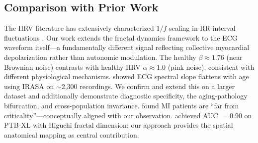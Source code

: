 \documentclass[11pt,a4paper]{article}
\begin{document}
\subsection{Comparison with Prior Work}
The HRV literature has extensively characterized $1/f$ scaling in RR-interval fluctuations \citep{Peng1995, Ivanov1999, Goldberger2002}. Our work extends the fractal dynamics framework to the ECG waveform itself---a fundamentally different signal reflecting collective myocardial depolarization rather than autonomic modulation. The healthy $\beta \approx 1.76$ (near Brownian noise) contrasts with healthy HRV $\alpha \approx 1.0$ (pink noise), consistent with different physiological mechanisms.
\citet{Schmidt2025} showed ECG spectral slope flattens with age using IRASA on $\sim$2,300 recordings. We confirm and extend this on a larger dataset and additionally demonstrate diagnostic specificity, the aging-pathology bifurcation, and cross-population invariance. \citet{Contoyiannis2021} found MI patients are ``far from criticality''---conceptually aligned with our observation. \citet{George2025} achieved AUC $= 0.90$ on PTB-XL with Higuchi fractal dimension; our approach provides the spatial anatomical mapping as central contribution.
\end{document}
